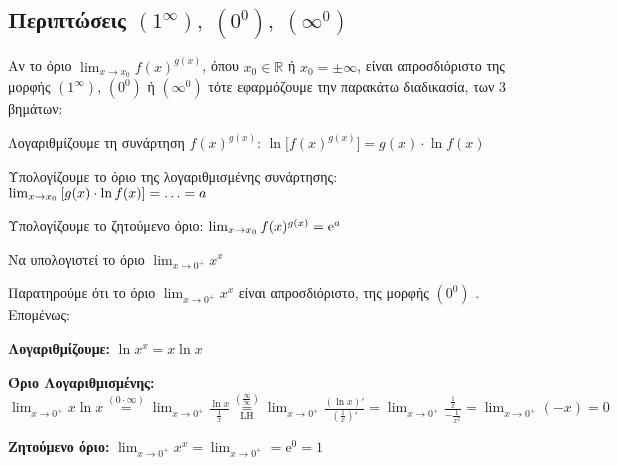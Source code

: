 \subsection*{Περιπτώσεις $ (1^{\infty}), \; (0^{0}), \; (\infty^{0}) $}

Αν το όριο $ \lim_{x \to x_{0}} f(x)^{g(x)} $, όπου $ x_{0} \in
\mathbb{R} $ ή $ x_{0}= \pm \infty $, είναι απροσδιόριστο της μορφής 
$ (1^{\infty}) $, $ (0^0) $ ή $ (\infty^{0}) $ 
τότε εφαρμόζουμε την παρακάτω διαδικασία, των 3 βημάτων:
\begin{myitemize}
  \item \textcolor{Col1}{Λογαριθμίζουμε τη συνάρτηση $ f(x)^{g(x)} $:} $ \ln{\bigl[f(x)^{g(x)}\bigr]} = g(x)\cdot \ln{f(x)} $
  \item \textcolor{Col1}{Υπολογίζουμε το όριο της λογαριθμισμένης συνάρτησης:} 
    $ \lim_{\smash{x \to x_{0}}} \left[g(x)\cdot \ln{f(x)}\right] = \ldots = a $
  \item \textcolor{Col1}{Υπολογίζουμε το ζητούμενο όριο:} 
    $ \lim_{x \to x_{0}} \smash{f(x)^{g(x)}} = \mathrm{e}^{a} $
\end{myitemize}

\begin{example}
  Να υπολογιστεί το όριο $ \lim_{x \to 0^{+}} x^{x} $
\end{example}
\begin{solution}
  Παρατηρούμε ότι το όριο $ \lim_{x \to 0^{+}} x^{x} $ είναι απροσδιόριστο, της μορφής 
  $( 0^{0}) $ . Επομένως:
  \begin{myitemize}
    \item \textbf{Λογαριθμίζουμε:} $ \ln{x^{x}} = x \ln{x} $
    \item \textbf{Όριο Λογαριθμισμένης:} $ \lim_{x \to 0^{+}} x \ln{x} \overset{(0 \cdot
      \infty)}{=} \lim_{x \to 0^{+}} \frac{\ln{x}}{\frac{1}{x}}
      \overset{\left(\frac{\infty}{\infty}\right)}{\underset{\mathrm{LH}}{=}}  
      \lim_{x \to 0^{+}} \frac{(\ln{x} )'}{(\frac{1}{x} )'} = \lim_{x \to 0^{+}}
      \frac{\frac{1}{x}}{- \frac{1}{x^{2}}} = \lim_{x \to 0^{+}} (-x) = 0 $
    \item \textbf{Ζητούμενο όριο:} $ \lim_{x \to 0^{+}} x^{x} = \lim_{x \to 0^{+}} = 
      \mathrm{e}^{0} = 1 $ 
  \end{myitemize}
\end{solution}

